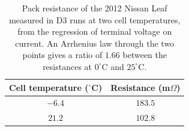 \begin{table}[htbp]
\centering\small
\caption{Pack resistance of the 2012 Nissan Leaf measured in D3 runs at two cell temperatures, from the regression of terminal voltage on current. An Arrhenius law through the two points gives a ratio of $1.66$ between the resistances at $0^\circ$C and $25^\circ$C.}\label{tab:app-battery}
\begin{tabular}{cc}
\toprule
Cell temperature ($^\circ$C) & Resistance (m$\Omega$)\\
\midrule
$-6.4$ & $183.5$\\
$21.2$ & $102.8$\\
\bottomrule
\end{tabular}
\end{table}
